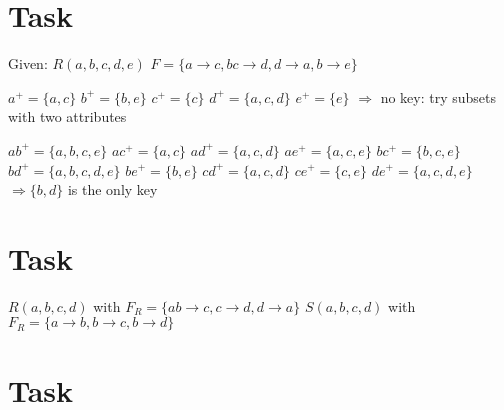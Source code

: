 \documentclass{article}
\begin{document}
\section{Task}
\par Given: \newline
$R(a, b, c, d, e)$ \newline
$F = \{  
        a \rightarrow c,
        bc \rightarrow d,
        d \rightarrow a,
        b \rightarrow e
    \}$
\par
$a^{+} = \{a, c \}$ \newline
$b^{+} = \{b, e \}$ \newline
$c^{+} = \{c \}$ \newline
$d^{+} = \{a, c, d \}$ \newline
$e^{+} = \{e \}$ \newline
$\Rightarrow$ no key: try subsets with two attributes

\par
$ab^{+} = \{a, b, c, e \}$ \newline
$ac^{+} = \{a, c \}$ \newline
$ad^{+} = \{a, c, d \}$ \newline
$ae^{+} = \{a, c, e \}$ \newline
$bc^{+} = \{b, c, e \}$ \newline
$bd^{+} = \{a, b, c, d, e \}$ \newline
$be^{+} = \{b, e \}$ \newline
$cd^{+} = \{a, c, d \}$ \newline
$ce^{+} = \{c, e \}$ \newline
$de^{+} = \{a, c, d, e \}$ \newline
$\Rightarrow \{b, d\}$ is the only key

\section{Task}
$R(a, b, c, d)$ with $F_{R} = \{ ab \rightarrow c, c \rightarrow d, d \rightarrow a \}$ \newline
$S(a, b, c, d)$ with $F_{R} = \{ a \rightarrow b, b \rightarrow c, b \rightarrow d \}$

\section{Task}
\end{document}
